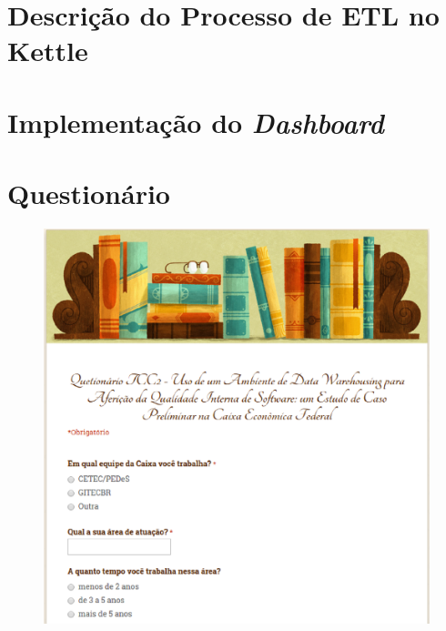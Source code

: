\begin{apendicesenv}

\chapter{Descrição do Processo de ETL no Kettle}
\label{sec:implementação-etl}



\chapter{Implementação do \textit{Dashboard}}
\label{sec:implementação-dashboard}


\chapter{Questionário}
\label{sec:questionário}

\begin{figure}[h!]
\centering
\includegraphics[keepaspectratio=false,scale=0.50]{figuras/figuras_nilton/questionario1.eps}
\label{questionario1}
\end{figure}


\end{apendicesenv}
